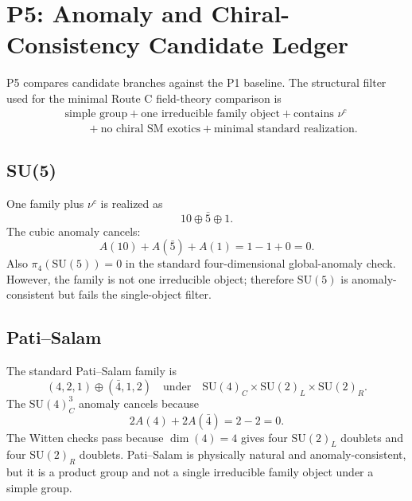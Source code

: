 \documentclass[11pt]{article}
\newcommand{\SU}{\mathrm{SU}}
\newcommand{\nuc}{\nu^c}
\begin{document}
\section{P5: Anomaly and Chiral-Consistency Candidate Ledger}

P5 compares candidate branches against the P1 baseline.  The structural
filter used for the minimal Route C field-theory comparison is
\begin{equation}
\begin{split}
  &\text{simple group}
  +\text{one irreducible family object}
  +\text{contains }\nuc  \\
  &\qquad
  +\text{no chiral SM exotics}
  +\text{minimal standard realization}.
\end{split}
\end{equation}

\subsection{SU(5)}

One family plus $\nuc$ is realized as
\begin{equation}
  10\oplus \bar 5\oplus 1.
\end{equation}
The cubic anomaly cancels:
\begin{equation}
  A(10)+A(\bar 5)+A(1)=1-1+0=0.
\end{equation}
Also $\pi_4(\SU(5))=0$ in the standard four-dimensional global-anomaly
check.  However, the family is not one irreducible object; therefore
$\SU(5)$ is anomaly-consistent but fails the single-object filter.

\subsection{Pati--Salam}

The standard Pati--Salam family is
\begin{equation}
  (4,2,1)\oplus(\bar 4,1,2)
  \quad\text{under}\quad
  \SU(4)_C\times\SU(2)_L\times\SU(2)_R .
\end{equation}
The $\SU(4)_C^3$ anomaly cancels because
\begin{equation}
  2A(4)+2A(\bar 4)=2-2=0.
\end{equation}
The Witten checks pass because $\dim(4)=4$ gives four $\SU(2)_L$
doublets and four $\SU(2)_R$ doublets.  Pati--Salam is physically natural
and anomaly-consistent, but it is a product group and not a single
irreducible family object under a simple group.
\end{document}
